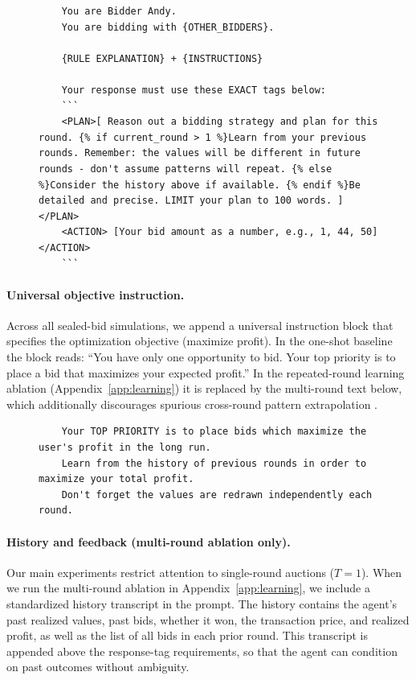 \documentclass{article} %
\newif\ifmarkrev
\newcommand{\rev}[1]{\ifmarkrev\begingroup\color{red}#1\endgroup\else#1\fi}
\begin{document}
\begin{figure}[H]
\centering
\begin{minipage}{0.95\textwidth}
\begin{lstlisting}
    You are Bidder Andy.
    You are bidding with {OTHER_BIDDERS}.

    {RULE EXPLANATION} + {INSTRUCTIONS}

    Your response must use these EXACT tags below:
    ```
    <PLAN>[ Reason out a bidding strategy and plan for this round. {% if current_round > 1 %}Learn from your previous rounds. Remember: the values will be different in future rounds - don't assume patterns will repeat. {% else %}Consider the history above if available. {% endif %}Be detailed and precise. LIMIT your plan to 100 words. ] </PLAN>
    <ACTION> [Your bid amount as a number, e.g., 1, 44, 50] </ACTION>
    ```
\end{lstlisting}
\end{minipage}
\end{figure}


\paragraph{Universal objective instruction.}
Across all sealed-bid simulations, we append a universal instruction block that specifies the optimization objective (maximize profit). \rev{In the one-shot baseline the block reads: ``You have only one opportunity to bid. Your top priority is to place a bid that maximizes your expected profit.'' In the repeated-round learning ablation (Appendix~\ref{app:learning}) it is replaced by the multi-round text below, which additionally discourages spurious cross-round pattern extrapolation \citep{fish2024algorithmic}.}
\begin{figure}[H]
\centering
\begin{minipage}{0.95\textwidth}
\begin{lstlisting}
    Your TOP PRIORITY is to place bids which maximize the user's profit in the long run.
    Learn from the history of previous rounds in order to maximize your total profit.
    Don't forget the values are redrawn independently each round.
\end{lstlisting}
\end{minipage}
\end{figure}

\paragraph{History and feedback (multi-round ablation only).}
Our main experiments restrict attention to single-round auctions ($T=1$). When we run the multi-round ablation in Appendix~\ref{app:learning}, we include a standardized history transcript in the prompt. The history contains the agent's past realized values, past bids, whether it won, the transaction price, and realized profit, as well as the list of all bids in each prior round. This transcript is appended above the response-tag requirements, so that the agent can condition on past outcomes without ambiguity.
\end{document}
